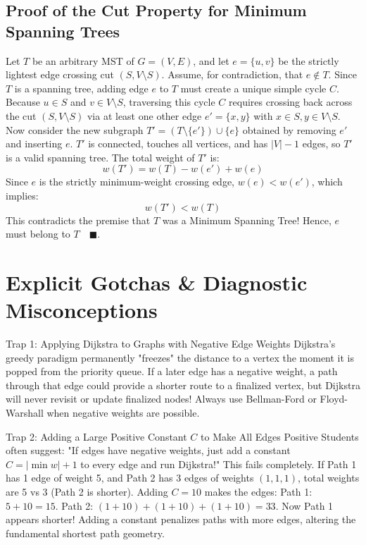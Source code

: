 \subsection{Proof of the Cut Property for Minimum Spanning Trees}
Let $T$ be an arbitrary MST of $G = (V, E)$, and let $e = \{u, v\}$ be the strictly lightest edge crossing cut $(S, V \setminus S)$.
Assume, for contradiction, that $e \notin T$.
Since $T$ is a spanning tree, adding edge $e$ to $T$ must create a unique simple cycle $C$. Because $u \in S$ and $v \in V \setminus S$, traversing this cycle $C$ requires crossing back across the cut $(S, V \setminus S)$ via at least one other edge $e' = \{x, y\}$ with $x \in S, y \in V \setminus S$.
Now consider the new subgraph $T' = (T \setminus \{e'\}) \cup \{e\}$ obtained by removing $e'$ and inserting $e$.
$T'$ is connected, touches all vertices, and has $|V| - 1$ edges, so $T'$ is a valid spanning tree. The total weight of $T'$ is:
\begin{equation}
w(T') = w(T) - w(e') + w(e)
\end{equation}
Since $e$ is the strictly minimum-weight crossing edge, $w(e) < w(e')$, which implies:
\begin{equation}
w(T') < w(T)
\end{equation}
This contradicts the premise that $T$ was a Minimum Spanning Tree! Hence, $e$ must belong to $T \quad \blacksquare$.

\section{Explicit Gotchas \& Diagnostic Misconceptions}

\begin{trapbox}{Trap 1: Applying Dijkstra to Graphs with Negative Edge Weights}
Dijkstra's greedy paradigm permanently "freezes" the distance to a vertex the moment it is popped from the priority queue. If a later edge has a negative weight, a path through that edge could provide a shorter route to a finalized vertex, but Dijkstra will never revisit or update finalized nodes! Always use Bellman-Ford or Floyd-Warshall when negative weights are possible.
\end{trapbox}

\begin{trapbox}{Trap 2: Adding a Large Positive Constant $C$ to Make All Edges Positive}
Students often suggest: "If edges have negative weights, just add a constant $C = |\min w| + 1$ to every edge and run Dijkstra!" 
This fails completely. If Path 1 has 1 edge of weight 5, and Path 2 has 3 edges of weights $(1, 1, 1)$, total weights are 5 vs 3 (Path 2 is shorter). Adding $C = 10$ makes the edges:
Path 1: $5 + 10 = 15$.
Path 2: $(1+10) + (1+10) + (1+10) = 33$.
Now Path 1 appears shorter! Adding a constant penalizes paths with more edges, altering the fundamental shortest path geometry.
\end{trapbox}

